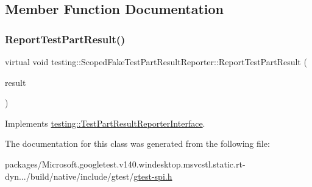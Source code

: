 \subsection{Member Function Documentation}
\mbox{\label{classtesting_1_1_scoped_fake_test_part_result_reporter_a3bc6cb939cbc3db71ece8846e6bafe00}} 
\subsubsection{\texorpdfstring{ReportTestPartResult()}{ReportTestPartResult()}}
{\footnotesize\ttfamily virtual void testing\+::\+Scoped\+Fake\+Test\+Part\+Result\+Reporter\+::\+Report\+Test\+Part\+Result (\begin{DoxyParamCaption}\item[{const \mbox{\hyperlink{classtesting_1_1_test_part_result}{Test\+Part\+Result}} \&}]{result }\end{DoxyParamCaption})\hspace{0.3cm}{\ttfamily [virtual]}}



Implements \mbox{\hyperlink{classtesting_1_1_test_part_result_reporter_interface_aa2f920e7a5a0a6d0faf19e3727928c22}{testing\+::\+Test\+Part\+Result\+Reporter\+Interface}}.



The documentation for this class was generated from the following file\+:\begin{DoxyCompactItemize}
\item 
packages/\+Microsoft.\+googletest.\+v140.\+windesktop.\+msvcstl.\+static.\+rt-\/dyn.../build/native/include/gtest/\mbox{\hyperlink{gtest-spi_8h}{gtest-\/spi.\+h}}\end{DoxyCompactItemize}
